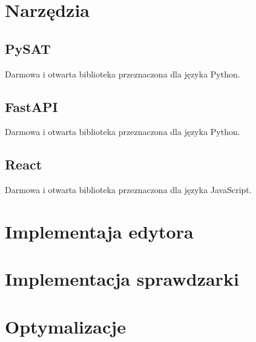 \documentclass[a4paper,12pt,oneside]{book}
\theoremstyle{definition}
\begin{document}
\section{Narzędzia}

\subsection{PySAT}

Darmowa i otwarta biblioteka przeznaczona dla języka Python.

\lipsum[1]

\lipsum[2]

\lipsum[3]

\subsection{FastAPI}

Darmowa i otwarta biblioteka przeznaczona dla języka Python.

\lipsum[1]

\lipsum[2]

\lipsum[3]

\subsection{React}

Darmowa i otwarta biblioteka przeznaczona dla języka JavaScript.

\lipsum[1]

\lipsum[2]

\lipsum[3]

\section{Implementaja edytora}

\lipsum[1]

\lipsum[2]

\lipsum[3]

\section{Implementacja sprawdzarki}

\lipsum[1]

\lipsum[2]

\lipsum[3]

\section{Optymalizacje}
\end{document}
